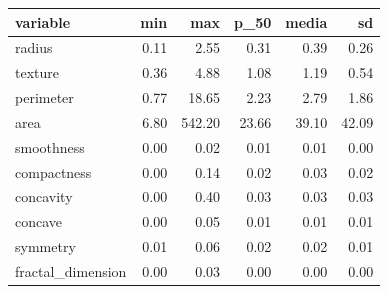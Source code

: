 \begin{tabular*}{\textwidth}{@{\extracolsep{\fill}}lrrrrr}
\toprule
variable & min & max & p\_50 & media & sd\\
\midrule
radius & 0.11 & 2.55 & 0.31 & 0.39 & 0.26\\
texture & 0.36 & 4.88 & 1.08 & 1.19 & 0.54\\
perimeter & 0.77 & 18.65 & 2.23 & 2.79 & 1.86\\
area & 6.80 & 542.20 & 23.66 & 39.10 & 42.09\\
smoothness & 0.00 & 0.02 & 0.01 & 0.01 & 0.00\\
\addlinespace
compactness & 0.00 & 0.14 & 0.02 & 0.03 & 0.02\\
concavity & 0.00 & 0.40 & 0.03 & 0.03 & 0.03\\
concave & 0.00 & 0.05 & 0.01 & 0.01 & 0.01\\
symmetry & 0.01 & 0.06 & 0.02 & 0.02 & 0.01\\
fractal\_dimension & 0.00 & 0.03 & 0.00 & 0.00 & 0.00\\
\bottomrule
\end{tabular*}
